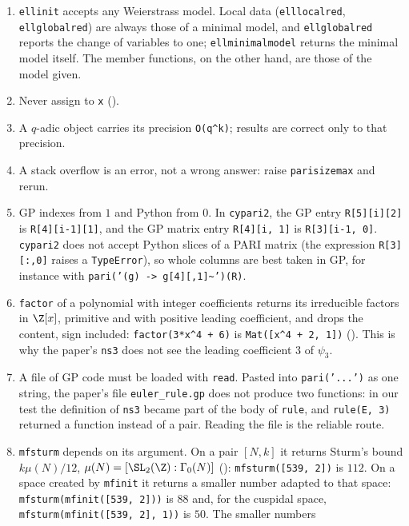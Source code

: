 \begin{sloppypar}
\begin{warning}[pitfalls]\label{warn:computation:pitfalls}
\begin{enumerate}[label=(\alph*)]
\item \texttt{ellinit} accepts any Weierstrass model. Local data (\texttt{elllocalred}, \texttt{ellglobalred}) are always those of a minimal
model, and \texttt{ellglobalred} reports the change of variables to one; \texttt{ellminimalmodel} returns the minimal model itself. The
member functions, on the other hand, are those of the model given.
\item Never assign to \texttt{x} ().
\item A $q$-adic object carries its precision \texttt{O(q\^{}k)}; results are correct only to that precision.
\item A stack overflow is an error, not a wrong answer: raise \texttt{parisizemax} and rerun.
\item GP indexes from $1$ and Python from $0$. In \texttt{cypari2}, the GP entry \texttt{R[5][i][2]} is \texttt{R[4][i-1][1]}, and the GP
matrix entry \texttt{R[4][i, 1]} is \texttt{R[3][i-1, 0]}. \texttt{cypari2} does not accept Python slices of a PARI matrix (the expression
\texttt{R[3][:,0]} raises a \texttt{TypeError}), so whole columns are best taken in GP, for instance with \texttt{pari('(g) -> g[4][,1]\textasciitilde')(R)}.
\item \texttt{factor} of a polynomial with integer coefficients returns its irreducible factors in $\Z[x]$, primitive and with positive
leading coefficient, and drops the content, sign included: \texttt{factor(3*x\^{}4 + 6)} is \texttt{Mat([x\^{}4 + 2, 1])}
(). This is why the paper's \texttt{ns3} does not see the leading coefficient $3$ of $\psi_3$.
\item A file of GP code must be loaded with \texttt{read}. Pasted into \texttt{pari('...')} as one string, the paper's file
\texttt{euler\_rule.gp} does not produce two functions: in our test the definition of \texttt{ns3} became part of the body of
\texttt{rule}, and \texttt{rule(E, 3)} returned a function instead of a pair. Reading the file is the reliable route.
\item \texttt{mfsturm} depends on its argument. On a pair $[N,k]$ it returns Sturm's bound $k\mu(N)/12$, $\mu(N)=[\SL_2(\Z):\Gamma_0(N)]$
(): \texttt{mfsturm([539, 2])} is $112$. On a space created by \texttt{mfinit} it returns a smaller number adapted to that
space: \texttt{mfsturm(mfinit([539, 2]))} is $88$ and, for the cuspidal space, \texttt{mfsturm(mfinit([539, 2], 1))} is $50$. The smaller numbers

\end{enumerate}
\end{warning}
\end{sloppypar}
